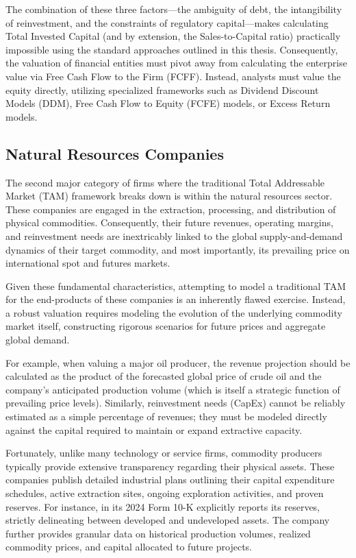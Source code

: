The combination of these three factors—the ambiguity of debt, the intangibility of reinvestment, and the constraints of regulatory capital—makes calculating Total Invested Capital (and by extension, the Sales-to-Capital ratio) practically impossible using the standard approaches outlined in this thesis. Consequently, the valuation of financial entities must pivot away from calculating the enterprise value via Free Cash Flow to the Firm (FCFF). Instead, analysts must value the equity directly, utilizing specialized frameworks such as Dividend Discount Models (DDM), Free Cash Flow to Equity (FCFE) models, or Excess Return models.

\subsection*{Natural Resources Companies}

The second major category of firms where the traditional Total Addressable Market (TAM) framework breaks down is within the natural resources sector. These companies are engaged in the extraction, processing, and distribution of physical commodities. Consequently, their future revenues, operating margins, and reinvestment needs are inextricably linked to the global supply-and-demand dynamics of their target commodity, and most importantly, its prevailing price on international spot and futures markets.

Given these fundamental characteristics, attempting to model a traditional TAM for the end-products of these companies is an inherently flawed exercise. Instead, a robust valuation requires modeling the evolution of the underlying commodity market itself, constructing rigorous scenarios for future prices and aggregate global demand.

For example, when valuing a major oil producer, the revenue projection should be calculated as the product of the forecasted global price of crude oil and the company's anticipated production volume (which is itself a strategic function of prevailing price levels). Similarly, reinvestment needs (CapEx) cannot be reliably estimated as a simple percentage of revenues; they must be modeled directly against the capital required to maintain or expand extractive capacity. 

Fortunately, unlike many technology or service firms, commodity producers typically provide extensive transparency regarding their physical assets. These companies publish detailed industrial plans outlining their capital expenditure schedules, active extraction sites, ongoing exploration activities, and proven reserves. For instance, in its 2024 Form 10-K \textcite{exxon202410k} explicitly reports its reserves, strictly delineating between developed and undeveloped assets. The company further provides granular data on historical production volumes, realized commodity prices, and capital allocated to future projects.


